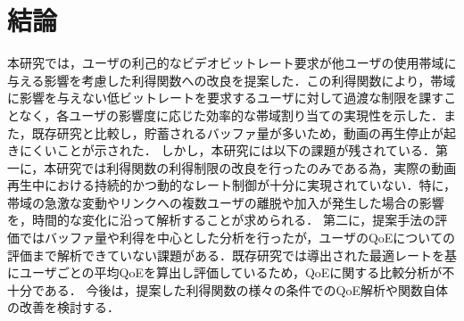 \chapter{結論}
本研究では，ユーザの利己的なビデオビットレート要求が他ユーザの使用帯域に与える影響を考慮した利得関数への改良を提案した．この利得関数により，帯域に影響を与えない低ビットレートを要求するユーザに対して過渡な制限を課すことなく，各ユーザの影響度に応じた効率的な帯域割り当ての実現性を示した．また，既存研究\cite{kison}と比較し，貯蓄されるバッファ量が多いため，動画の再生停止が起きにくいことが示された．
しかし，本研究には以下の課題が残されている．第一に，本研究では利得関数の利得制限の改良を行ったのみである為，実際の動画再生中における持続的かつ動的なレート制御が十分に実現されていない．特に，帯域の急激な変動やリンクへの複数ユーザの離脱や加入が発生した場合の影響を，時間的な変化に沿って解析することが求められる．
第二に，提案手法の評価ではバッファ量や利得を中心とした分析を行ったが，ユーザのQoEについての評価まで解析できていない課題がある．既存研究\cite{kison}では導出された最適レートを基にユーザごとの平均QoEを算出し評価しているため，QoEに関する比較分析が不十分である．
今後は，提案した利得関数の様々の条件でのQoE解析や関数自体の改善を検討する．